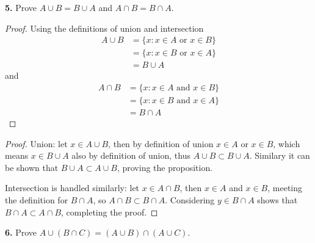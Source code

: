 \documentclass[12pt]{amsart}
\newenvironment{statement}[1]{\smallskip\noindent\color[rgb]{1.00,0.00,0.50} {\bf #1.}}{}
\theoremstyle{definition}
\theoremstyle{remark}
\begin{document}
\begin{statement}{5}
Prove $A \cup B = B \cup A$ and $A \cap B = B \cap A$.
\end{statement}
\begin{proof}
Using the definitions of union and intersection
\begin{align*}
  A \cup B &= \{x : x \in A \text{ or } x \in B\} \\
    &= \{x : x \in B \text{ or } x \in A\} \\
      &= B \cup A
\end{align*}
and
\begin{align*}
  A \cap B &= \{x : x \in A \text{ and } x \in B\} \\
    &= \{x : x \in B \text{ and } x \in A\} \\
      &= B \cap A
\end{align*}

\end{proof}

\begin{proof}
Union: let $ x \in A \cup B$, then by definition of union $x \in A$ or
$x \in B$, which means $x \in B \cup A$ also by definition of union, thus $A
\cup B \subset B \cup A$. Similary it can be shown that $B \cup A
\subset A \cup B$, proving the proposition.

Intersection is handled similarly: let $x \in A \cap B$, then $x \in
A$ and $x \in B$, meeting the definition for $B \cap A$, so $A \cap B
\subset B \cap A$. Considering $y \in B \cap A$ shows that $B \cap A
\subset A \cap B$, completing the proof.
\end{proof}


\begin{statement}{6}
Prove $A \cup (B \cap C) = (A \cup B) \cap (A \cup C)$.
\end{statement}
\end{document}
